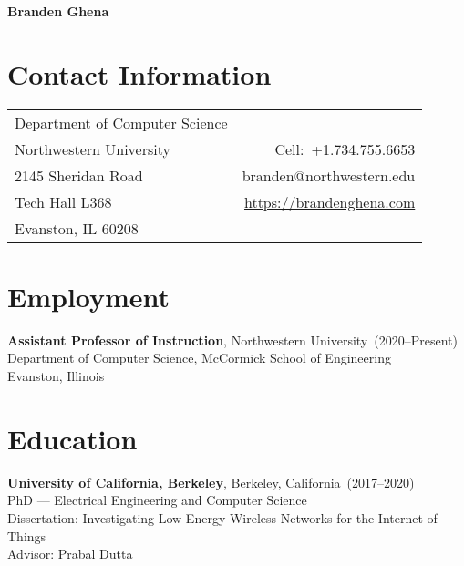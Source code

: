 \documentclass{article}
\begin{document}

\nocite{*}

\begin{center}
    \Huge{\bf{Branden Ghena}} \\
\end{center}

\section*{Contact Information}

\begin{table}[H]
\centering
\vspace*{-16pt}
\begin{tabularx}{\linewidth}{@{} X r @{}}
    {Department of Computer Science}     & {} \\
    {Northwestern University}   & {Cell:~+1.734.755.6653} \\
    {2145 Sheridan Road} & {branden@northwestern.edu} \\
    {Tech Hall L368} & \url{https://brandenghena.com} \\
    {Evanston, IL 60208} & {} \\
\end{tabularx}
\end{table}

\section*{Employment}
\vspace{-6pt}

{\bf Assistant Professor of Instruction}, Northwestern University~(2020--Present) \\
Department of Computer Science, McCormick School of Engineering \\
Evanston, Illinois


\section*{Education}
\vspace{-6pt}

{\bf University of California, Berkeley}, Berkeley, California~(2017--2020) \\
PhD --- Electrical Engineering and Computer Science \\
Dissertation: Investigating Low Energy Wireless Networks for the Internet of Things \\
Advisor: Prabal Dutta
\end{document}
